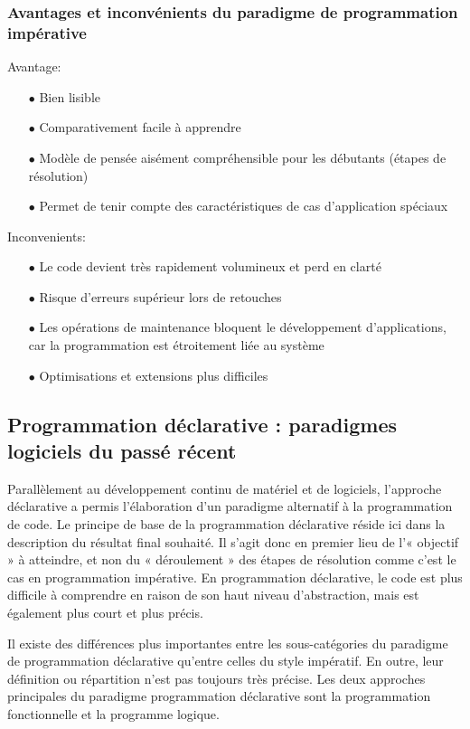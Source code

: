 \documentclass[a4paper,12pt]{article} %
\begin{document}
\subsubsection{Avantages et inconvénients du paradigme de programmation impérative}

Avantage:
\begin{itemize}
   \item[$\bullet$]Bien lisible
   \item[$\bullet$]Comparativement facile à apprendre
   \item[$\bullet$]Modèle de pensée aisément compréhensible pour les débutants (étapes de résolution)
   \item[$\bullet$]Permet de tenir compte des caractéristiques de cas d’application spéciaux
\end{itemize}

Inconvenients:
\begin{itemize}
\item[$\bullet$]Le code devient très rapidement volumineux et perd en clarté
\item[$\bullet$]Risque d’erreurs supérieur lors de retouches
\item[$\bullet$]Les opérations de maintenance bloquent le développement d’applications, car la programmation est étroitement liée au système
\item[$\bullet$]Optimisations et extensions plus difficiles
\end{itemize}


\subsection{Programmation déclarative : paradigmes logiciels du passé récent} %

Parallèlement au développement continu de matériel et de logiciels, l’approche déclarative a permis l’élaboration d’un paradigme alternatif à la programmation de code. Le principe de base de la programmation déclarative réside ici dans la description du résultat final souhaité. Il s’agit donc en premier lieu de l’« objectif » à atteindre, et non du « déroulement » des étapes de résolution comme c’est le cas en programmation impérative. En programmation déclarative, le code est plus difficile à comprendre en raison de son haut niveau d’abstraction, mais est également plus court et plus précis.

Il existe des différences plus importantes entre les sous-catégories du paradigme de programmation déclarative qu’entre celles du style impératif. En outre, leur définition ou répartition n’est pas toujours très précise. Les deux approches principales du paradigme programmation déclarative sont la programmation fonctionnelle et la programme logique.
\end{document}
